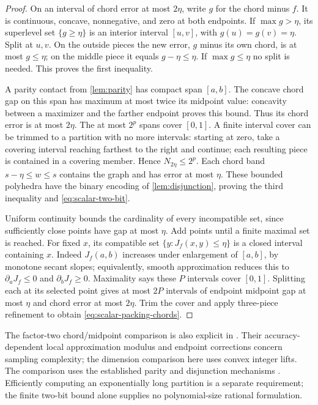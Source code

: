 \begin{proof}
On an interval of chord error at most $2\eta$, write $g$ for the chord
minus $f$. It is continuous, concave, nonnegative, and zero at both
endpoints. If $\max g>\eta$, its superlevel set $\{g\ge\eta\}$ is an
interior interval $[u,v]$, with $g(u)=g(v)=\eta$. Split at $u,v$.
On the outside pieces the new error, $g$ minus its own chord, is at
most $g\le\eta$; on the middle piece it equals $g-\eta\le\eta$.
If $\max g\le\eta$ no split is needed. This proves the first inequality.

A parity contact from \cref{lem:parity} has compact span $[a,b]$.
The concave chord gap on this span has maximum at most twice its
midpoint value: concavity between a maximizer and the farther endpoint
proves this bound. Thus its chord error is at most $2\eta$.
The at most $2^p$ spans cover $[0,1]$. A finite interval cover can be
trimmed to a partition with no more intervals: starting at zero, take
a covering interval reaching farthest to the right and continue;
each resulting piece is contained in a covering member. Hence
$N_{2\eta}\le2^p$. Each chord band $s-\eta\le w\le s$ contains
the graph and has error at most $\eta$. These bounded polyhedra have
the binary encoding of \cref{lem:disjunction}, proving the third
inequality and \eqref{eq:scalar-two-bit}.

Uniform continuity bounds the cardinality of every incompatible set,
since sufficiently close points have gap at most $\eta$. Add points
until a finite maximal set is reached. For fixed $x$, its compatible
set $\{y:J_f(x,y)\le\eta\}$ is a closed interval containing $x$.
Indeed $J_f(a,b)$ increases under enlargement of $[a,b]$, by monotone
secant slopes; equivalently, smooth approximation reduces this to
$\partial_aJ_f\le0$ and $\partial_bJ_f\ge0$. Maximality says these
$P$ intervals cover $[0,1]$. Splitting each at its selected point gives
at most $2P$ intervals of endpoint midpoint gap at most $\eta$ and
chord error at most $2\eta$. Trim the cover and apply three-piece
refinement to obtain \eqref{eq:scalar-packing-chords}.
\end{proof}

The factor-two chord/midpoint comparison is also explicit in
\citet[Lemma 2.1]{simchowitz2018}. Their accuracy-dependent local
approximation modulus and endpoint corrections concern sampling
complexity; the dimension comparison here uses convex integer lifts.
The comparison uses the established parity and disjunction mechanisms
\citep{lubin2022,vielma2018}. Efficiently computing an exponentially
long partition is a separate requirement; the finite two-bit bound
alone supplies no polynomial-size rational formulation.


